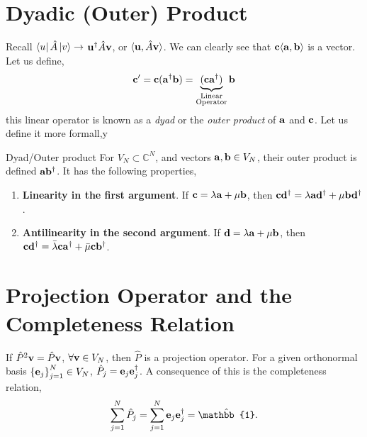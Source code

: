 \documentclass{book}
\def\innerproduct#1#2{\langle#1,#2\rangle}
\begin{document}
\section{Dyadic (Outer) Product}
Recall $\bra{u}\hat{A}\ket{v} \to$ $\vb{u}^{\dag}\hat{A}\vb{v}$, or $\innerproduct{\vb{u}}{\hat{A}\vb{v}}$. We can clearly see that $\vb{c}\innerproduct{\vb{a}}{\vb{b}}$ is a vector. Let us define,
\begin{equation}
	\vb{c}' = \vb{c}(\vb{a}^{\dag}\vb{b}) = \underbrace{(\vb{c}\vb{a}^{\dag})}_{\substack{\text{Linear}\\\text{Operator}}}\vb{b}
\end{equation}
this linear operator is known as a \textit{dyad} or the \textit{outer product} of $\vb{a}$ and $\vb{c}$. Let us define it more formall,y

\begin{Definitions}{Dyad/Outer product}{}
	For $V_N \subset \mathbb{C}^N$, and vectors $\vb{a},\vb{b} \in V_N$, their outer product is defined $\vb{a}\vb{b}^{\dag}$. It has the following properties,
	\begin{enumerate}
		\item \textbf{Linearity in the first argument}. If $\vb{c} = \lambda \vb{a} + \mu \vb{b}$, then $\vb{c}\vb{d}^{\dag} = \lambda\vb{a}\vb{d}^{\dag} + \mu\vb{b}\vb{d}^{\dag}$.
		\item \textbf{Antilinearity in the second argument}. If $\vb{d} = \lambda \vb{a} + \mu \vb{b}$, then $\vb{c}\vb{d}^{\dag} = \bar{\lambda}\vb{c}\vb{a}^{\dag} + \bar{\mu}\vb{c}\vb{b}^{\dag}$.
	\end{enumerate}
\end{Definitions}
\section{Projection Operator and the Completeness Relation}
If $\hat{P}^2\vb{v} = \hat{P}\vb{v}$, $\forall \vb{v} \in V_N$, then $\hat{P}$ is a projection operator. For a given orthonormal basis $\left\{\vb{e}_j\right\}_{j=1}^N \in V_N$, $\hat{P}_j = \vb{e}_j\vb{e}_j^{\dag}$. A consequence of this is the completeness relation, 
\begin{equation}
	\sum_{j=1}^N\hat{P}_j = \sum_{j=1}^N \vb{e}_j\vb{e}_j^{\dag} = \hat{\mathbb{1}}.
\end{equation}
\end{document}
